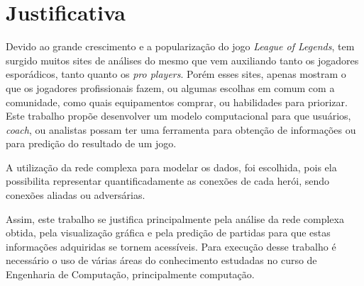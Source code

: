 \section{Justificativa}
Devido ao grande crescimento e a popularização do jogo \textit{League of Legends}, tem surgido muitos sites de análises do mesmo que vem auxiliando tanto os jogadores esporádicos, tanto quanto os \textit{pro players}. Porém esses sites, apenas mostram o que os jogadores profissionais fazem, ou algumas escolhas em comum com a comunidade, como quais equipamentos comprar, ou habilidades para priorizar.
Este trabalho propõe desenvolver um modelo computacional para que usuários, \textit{coach}, ou analistas possam ter uma ferramenta para obtenção de informações ou para predição do resultado de um jogo.

A utilização da rede complexa para modelar os dados, foi escolhida, pois ela possibilita representar quantificadamente as conexões de cada herói, sendo conexões aliadas ou adversárias.

Assim, este trabalho se justifica principalmente pela análise da rede complexa obtida, pela visualização gráfica e pela predição de partidas para que estas informações adquiridas se tornem acessíveis. 
Para execução desse trabalho é necessário o uso de várias áreas do conhecimento estudadas no curso de Engenharia de Computação, principalmente computação.
